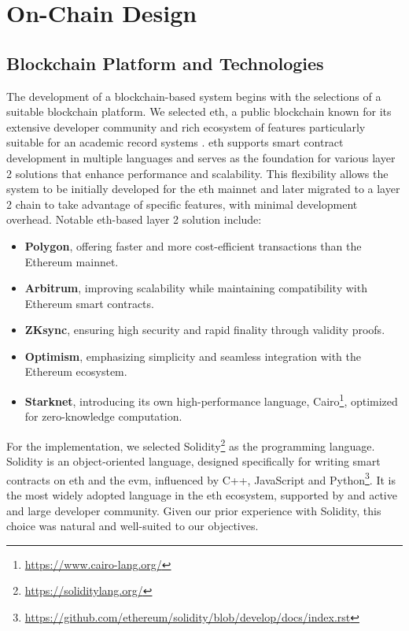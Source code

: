 \chapter{On-Chain Design}

\section{Blockchain Platform and Technologies}
The development of a blockchain-based system begins with the selections of a suitable blockchain platform. We selected \acrlong{eth}, a public blockchain known for its extensive developer community and rich ecosystem of features particularly suitable for an academic record systems \cite{mustafa2024publiceduchain}\cite{yassynzhanbolatzhan2021verificationuniversitystudent}. \acrlong{eth} supports smart contract development in multiple languages and serves as the foundation for various layer 2 solutions that enhance performance and scalability. This flexibility allows the system to be initially developed for the \acrlong{eth} mainnet and later migrated to a layer 2 chain to take advantage of specific features, with minimal development overhead. Notable \acrlong{eth}-based layer 2 solution include:

\begin{itemize}
    \item \textbf{Polygon}, offering faster and more cost-efficient transactions than the Ethereum mainnet.
    \item \textbf{Arbitrum}, improving scalability while maintaining compatibility with Ethereum smart contracts.
    \item \textbf{ZKsync}, ensuring high security and rapid finality through validity proofs.
    \item \textbf{Optimism}, emphasizing simplicity and seamless integration with the Ethereum ecosystem.
    \item \textbf{Starknet}, introducing its own high-performance language, Cairo\footnote{\url{https://www.cairo-lang.org/}}, optimized for zero-knowledge computation.
\end{itemize}

For the implementation, we selected Solidity\footnote{\url{https://soliditylang.org/}} as the programming language. Solidity is an object-oriented language, designed specifically for writing smart contracts on \acrlong{eth} and the \acrshort{evm}, influenced by C++, JavaScript and Python\footnote{\url{https://github.com/ethereum/solidity/blob/develop/docs/index.rst}}. It is the most widely adopted language in the \acrlong{eth} ecosystem, supported by and active and large developer community. Given our prior experience with Solidity, this choice was natural and well-suited to our objectives.

